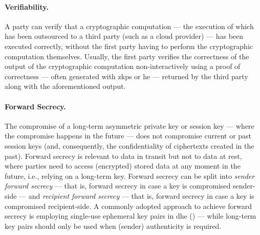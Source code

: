 \paragraph*{Verifiability.} A party can verify that a cryptographic computation --- the execution of which has been outsourced to a third party (such as a cloud provider) --- has been executed correctly, without the first party having to perform the cryptographic computation themselves. Usually, the first party verifies the correctness of the output of the cryptographic computation non-interactively using a proof of correctness --- often generated with \glspl{zkp} or \gls{he} 
--- returned by the third party along with the aforementioned output.

\paragraph*{Forward Secrecy.} The compromise of a long-term asymmetric private key or session key --- where the compromise happens in the future --- does not compromise current or past session keys (and, consequently, the confidentiality of ciphertexts created in the past). Forward secrecy is relevant to data in transit but not to data at rest, where parties need to access (encrypted) stored data at any moment in the future, i.e., relying on a long-term key. Forward secrecy can be split into \textit{sender forward secrecy} --- that is, forward secrecy in case a key is compromised sender-side --- and \textit{recipient forward secrecy} --- that is, forward secrecy in case a key is compromised recipient-side. A commonly adopted approach to achieve forward secrecy is employing single-use ephemeral key pairs in \gls{dhe} () --- while long-term key pairs should only be used when (sender) authenticity is required.



